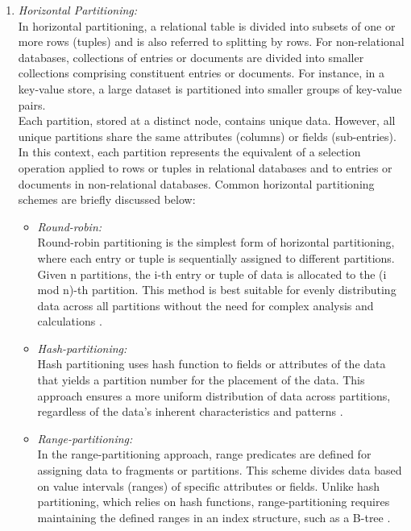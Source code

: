 \begin{enumerate}

\item \emph{Horizontal Partitioning:} \\
In horizontal partitioning, a relational table is divided into subsets of one or more rows (tuples) and is also referred to splitting by rows\cite{rahimi2010distributed, ozsu1999principles, silberschatz2011database}. For non-relational databases, collections of entries or documents are divided into smaller collections comprising constituent entries or documents. For instance, in a key-value store, a large dataset is partitioned into smaller groups of key-value pairs. \\

\noindent Each partition, stored at a distinct node, contains unique data. However, all unique partitions share the same attributes (columns) or fields (sub-entries). In this context, each partition represents the equivalent of a selection operation applied to rows or tuples in relational databases and to entries or documents in non-relational databases. Common horizontal partitioning schemes \cite{runceanu2008fragmentation, elmasri2000fundamentals} are briefly discussed below:

\begin{itemize}

\item [-] \emph{Round-robin:} \\
Round-robin partitioning is the simplest form of horizontal partitioning, where each entry or tuple is sequentially assigned to different partitions. Given n partitions, the i-th entry or tuple of data is allocated to the (i mod n)-th partition. This method is best suitable for evenly distributing data across all partitions without the need for complex analysis and calculations \cite{ozsu1999principles}.

\item [-] \emph{Hash-partitioning:} \\
Hash partitioning uses hash function to fields or attributes of the data that yields a partition number for the placement of the data. This approach ensures a more uniform distribution of data across partitions, regardless of the data's inherent characteristics and patterns \cite{liu1996hash}.

\item [-] \emph{Range-partitioning:} \\
In the range-partitioning approach, range predicates are defined for assigning data to fragments or partitions. This scheme divides data based on value intervals (ranges) of specific attributes or fields. Unlike hash partitioning, which relies on hash functions, range-partitioning requires maintaining the defined ranges in an index structure, such as a B-tree \cite{ozsu1999principles}.


\end{itemize}
\end{enumerate}
